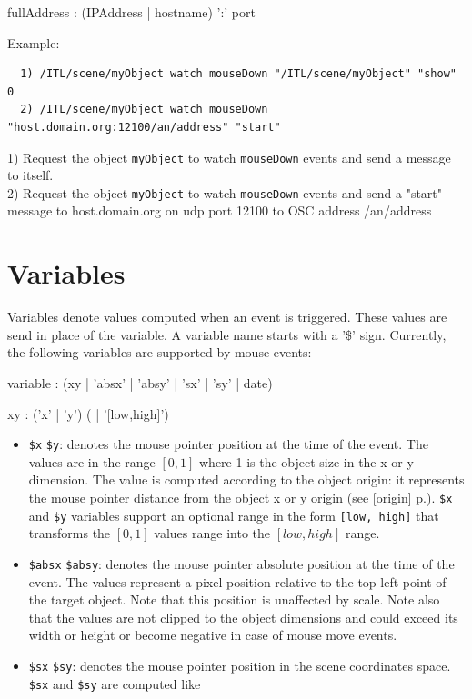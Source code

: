 \documentclass[a4paper,twoside]{report}
\newcommand{\sublevel}[1]	{\section{#1}}
\newcommand{\fullref}[1]	{\ref{#1} p.\pageref{#1}}
\newcommand{\OSC}[1]		{\texttt{#1}}
\begin{document}
\begin{rail} 
fullAddress : (IPAddress | hostname) ':' port
\end{rail}

Example:
\begin{verbatim}
  1) /ITL/scene/myObject watch mouseDown "/ITL/scene/myObject" "show" 0 
  2) /ITL/scene/myObject watch mouseDown "host.domain.org:12100/an/address" "start" 
\end{verbatim}
1) Request the object \OSC{myObject} to watch \OSC{mouseDown} events and send a message to itself. \\
2) Request the object \OSC{myObject} to watch \OSC{mouseDown} events and send a "start" message to host.domain.org on udp port 12100 to OSC address /an/address


\sublevel{Variables}
\label{interactvar}

Variables denote values computed when an event is triggered. These values are send in place of the variable. A variable name starts with a '\$' sign. Currently, the following variables are supported by mouse events:
\begin{rail} 
variable : (xy | 'absx' | 'absy' | 'sx' | 'sy' | date) 
\end{rail}

\begin{rail} 
xy : ('x' | 'y') ( | '[low,high]') 
\end{rail}

\begin{itemize}
\item \OSC{\$x} \OSC{\$y}: denotes the mouse pointer position at the time of the event. The values are in the range $[0,1]$ where 1 is the object size in the x or y dimension. The value is computed according to the object origin: it represents the mouse pointer distance from the object x or y origin (see \fullref{origin}). \OSC{\$x} and \OSC{\$y} variables support an optional range in the form \OSC{[low, high]} that transforms the $[0,1]$  values range into the $[low, high]$ range.

\item \OSC{\$absx} \OSC{\$absy}: denotes the mouse pointer absolute position at the time of the event. The values represent a pixel position relative to the top-left point of the target object. Note that this position is unaffected by scale. 
Note also that the values are not clipped to the object dimensions and could exceed its width or height or become negative in case of mouse move events.

\item \OSC{\$sx} \OSC{\$sy}: denotes the mouse pointer position in the scene coordinates space. \OSC{\$sx} and \OSC{\$sy} are computed like
\end{itemize}
\end{document}
